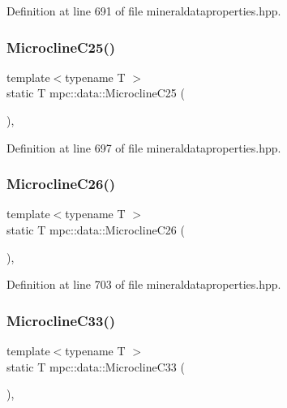 Definition at line 691 of file mineraldataproperties.\+hpp.

\mbox{\label{namespacempc_1_1data_a8528a782758cc2f87e96e85806db5348}} 
\subsubsection{\texorpdfstring{Microcline\+C25()}{MicroclineC25()}}
{\footnotesize\ttfamily template$<$typename T $>$ \\
static T mpc\+::data\+::\+Microcline\+C25 (\begin{DoxyParamCaption}{ }\end{DoxyParamCaption})\hspace{0.3cm}{\ttfamily [inline]}, {\ttfamily [static]}}



Definition at line 697 of file mineraldataproperties.\+hpp.

\mbox{\label{namespacempc_1_1data_a6155e1982a7b7e3303c621ba5dfe07ac}} 
\subsubsection{\texorpdfstring{Microcline\+C26()}{MicroclineC26()}}
{\footnotesize\ttfamily template$<$typename T $>$ \\
static T mpc\+::data\+::\+Microcline\+C26 (\begin{DoxyParamCaption}{ }\end{DoxyParamCaption})\hspace{0.3cm}{\ttfamily [inline]}, {\ttfamily [static]}}



Definition at line 703 of file mineraldataproperties.\+hpp.

\mbox{\label{namespacempc_1_1data_a9a8b16ee013b5b86564154beacd24317}} 
\subsubsection{\texorpdfstring{Microcline\+C33()}{MicroclineC33()}}
{\footnotesize\ttfamily template$<$typename T $>$ \\
static T mpc\+::data\+::\+Microcline\+C33 (\begin{DoxyParamCaption}{ }\end{DoxyParamCaption})\hspace{0.3cm}{\ttfamily [inline]}, {\ttfamily [static]}}



